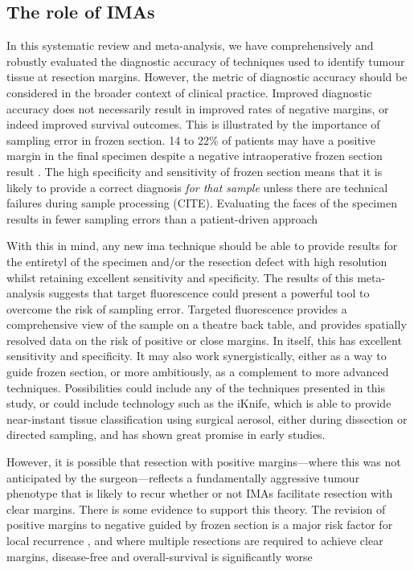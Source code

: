 \subsection{The role of IMAs}
In this systematic review and meta-analysis, we have comprehensively and robustly evaluated the diagnostic accuracy of techniques used to identify tumour tissue at resection margins.
However, the metric of diagnostic accuracy should be considered in the broader context of clinical practice.
Improved diagnostic accuracy does not necessarily result in improved rates of negative margins, or indeed improved survival outcomes.
This is illustrated by the importance of sampling error in frozen section. 
14 to 22\% of patients may have a positive margin in the final specimen despite a negative intraoperative frozen section result \cite{ordAccuracyFrozenSections1997, due.RefiningUtilityRole2016}.
The high specificity and sensitivity of frozen section means that it is likely to provide a correct diagnosis \textit{for that sample} unless there are technical failures during sample processing (CITE).
Evaluating the faces of the specimen results in fewer sampling errors than a patient-driven approach \cite{aaboubouty.SpecimendrivenIntraoperativeAssessment2020, amitImprovingRateNegative2016, due.RefiningUtilityRole2016, maxwellEarlyOralTongue2015, bergeronm.DecreasingLocoregionalRecurrence2016}

With this in mind, any new \gls{ima} technique should be able to provide results for the entiretyl of the specimen and/or the resection defect with high resolution whilst retaining excellent sensitivity and specificity.
The results of this meta-analysis suggests that target fluorescence could present a powerful tool to overcome the risk of sampling error.
Targeted fluorescence provides a comprehensive view of the sample on a theatre back table, and provides spatially resolved data on the risk of positive or close margins.
In itself, this has excellent sensitivity and specificity. 
It may also work synergistically, either as a way to guide frozen section, or more ambitiously, as a complement to more advanced techniques.
Possibilities could include any of the techniques presented in this study, or could include technology such as the iKnife, which is able to provide near-instant tissue classification using surgical aerosol, either during dissection or directed sampling, and has shown great promise in early studies.


However, it is possible that resection with positive margins---where this was not anticipated by the surgeon---reflects a fundamentally aggressive tumour phenotype that is likely to recur whether or not IMAs facilitate resection with clear margins.
There is some evidence to support this theory.
The revision of positive margins to negative guided by frozen section is a major risk factor for local recurrence \cite{ettlt.PositiveFrozenSection2016}, and where multiple resections are required to achieve clear margins, disease-free and overall-survival is significantly worse \cite{mooreTransoralRoboticSurgery2018}

